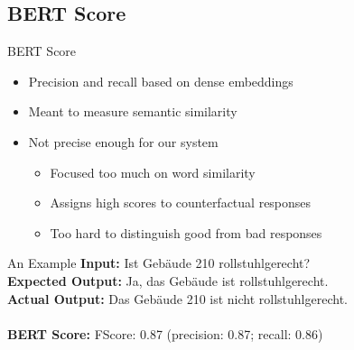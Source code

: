\documentclass{sdqbeamer}[smallfoot]
\begin{document}
\subsection{BERT Score}
\begin{frame}{BERT Score}
    \begin{itemize}
        \item Precision and recall based on dense embeddings
        \item Meant to measure semantic similarity
        \item Not precise enough for our system
            \begin{itemize}
                \item Focused too much on word similarity
                \item Assigns high scores to counterfactual responses
                \item Too hard to distinguish good from bad responses
            \end{itemize}
    \end{itemize}
    \vspace{1cm}
    \setlength\unitlength{1cm}
    \begin{minipage}{0.55\linewidth}
        \begin{greenblock}{An Example}
    	\textbf{Input:} Ist Gebäude 210 rollstuhlgerecht?\\
            \textbf{Expected Output:} Ja, das Gebäude ist rollstuhlgerecht.\\
            \textbf{Actual Output:} Das Gebäude 210 ist nicht rollstuhlgerecht.\\
            \vspace{0.1cm}\\
            \textbf{BERT Score:} FScore: 0.87 (precision: 0.87; recall: 0.86)
        \end{greenblock}
    \end{minipage}
\end{frame}
\end{document}
